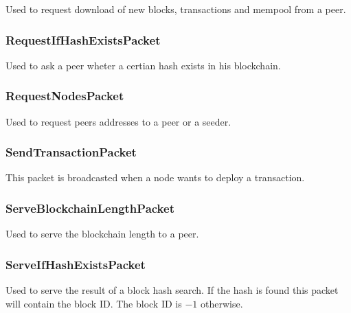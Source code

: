 \documentclass[../documentation.tex]{subfiles}
\begin{document}
Used to request download of new blocks, transactions and mempool
from a peer.


\subsubsection{RequestIfHashExistsPacket}

Used to ask a peer wheter a certian hash exists in his blockchain.


\subsubsection{RequestNodesPacket}

Used to request peers addresses to a peer or a seeder.


\subsubsection{SendTransactionPacket}

This packet is broadcasted when a node wants to deploy a transaction.


\subsubsection{ServeBlockchainLengthPacket}

Used to serve the blockchain length to a peer.


\subsubsection{ServeIfHashExistsPacket}

Used to serve the result of a block hash search.
If the hash is found this packet will contain the block ID.
The block ID is \(-1\) otherwise.
\end{document}
